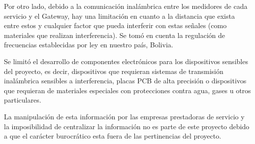 Por otro lado, debido a la comunicación inalámbrica entre los medidores de cada
servicio y el Gateway, hay una limitación en cuanto a la distancia que exista entre
estos y cualquier factor que pueda interferir con estas señales (como materiales que
realizan interferencia). Se tomó en cuenta la regulación de frecuencias establecidas
por ley en nuestro país, Bolivia.

Se limitó el desarrollo de componentes electrónicos para los dispositivos sensibles del
proyecto, es decir, dispositivos que requieran sistemas de transmisión inalámbrica sensibles
a interferencia, placas PCB de alta precisión o dispositivos que requieran de materiales
especiales con protecciones contra agua, gases u otros particulares.

La manipulación de esta información por las empresas prestadoras de servicio y la imposibilidad
de centralizar la información no es parte de este proyecto debido a que el carácter burocrático
esta fuera de las pertinencias del proyecto.